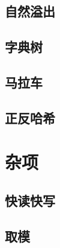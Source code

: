 \documentclass[10pt,a4paper]{article}
\begin{document}
\subsection{自然溢出}

\subsection{字典树}

\subsection{马拉车}

\subsection{正反哈希}

\section{杂项}
\subsection{快读快写}

\subsection{取模}

\end{document}

